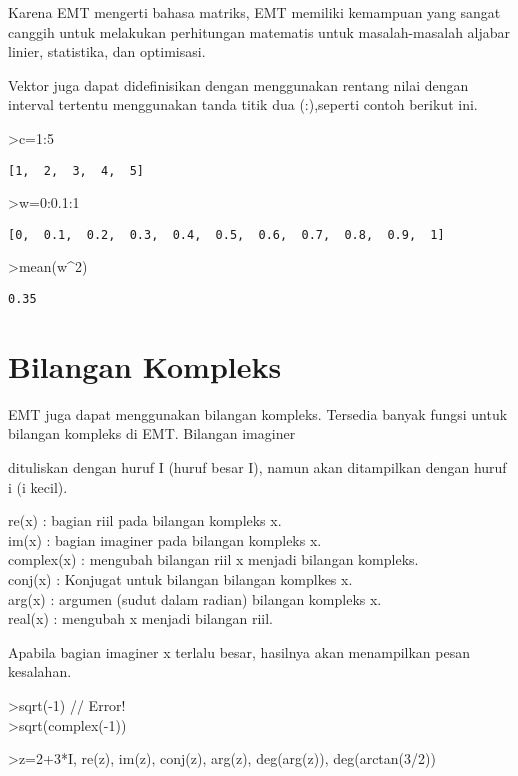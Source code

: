 \documentclass[
]{book}
\begin{document}
Karena EMT mengerti bahasa matriks, EMT memiliki kemampuan yang sangat canggih untuk melakukan perhitungan matematis untuk masalah-masalah aljabar linier, statistika, dan optimisasi.

Vektor juga dapat didefinisikan dengan menggunakan rentang nilai dengan interval tertentu menggunakan tanda titik dua (:),seperti contoh berikut ini.

\textgreater c=1:5

\begin{verbatim}
[1,  2,  3,  4,  5]
\end{verbatim}

\textgreater w=0:0.1:1

\begin{verbatim}
[0,  0.1,  0.2,  0.3,  0.4,  0.5,  0.6,  0.7,  0.8,  0.9,  1]
\end{verbatim}

\textgreater mean(w\^{}2)

\begin{verbatim}
0.35
\end{verbatim}

\chapter{Bilangan Kompleks}\label{bilangan-kompleks}

EMT juga dapat menggunakan bilangan kompleks. Tersedia banyak fungsi untuk bilangan kompleks di EMT. Bilangan imaginer

dituliskan dengan huruf I (huruf besar I), namun akan ditampilkan dengan huruf i (i kecil).

re(x) : bagian riil pada bilangan kompleks x.\\
im(x) : bagian imaginer pada bilangan kompleks x.\\
complex(x) : mengubah bilangan riil x menjadi bilangan kompleks.\\
conj(x) : Konjugat untuk bilangan bilangan komplkes x.\\
arg(x) : argumen (sudut dalam radian) bilangan kompleks x.\\
real(x) : mengubah x menjadi bilangan riil.

Apabila bagian imaginer x terlalu besar, hasilnya akan menampilkan pesan kesalahan.

\textgreater sqrt(-1) // Error!\\
\textgreater sqrt(complex(-1))

\textgreater z=2+3*I, re(z), im(z), conj(z), arg(z), deg(arg(z)), deg(arctan(3/2))
\end{document}
